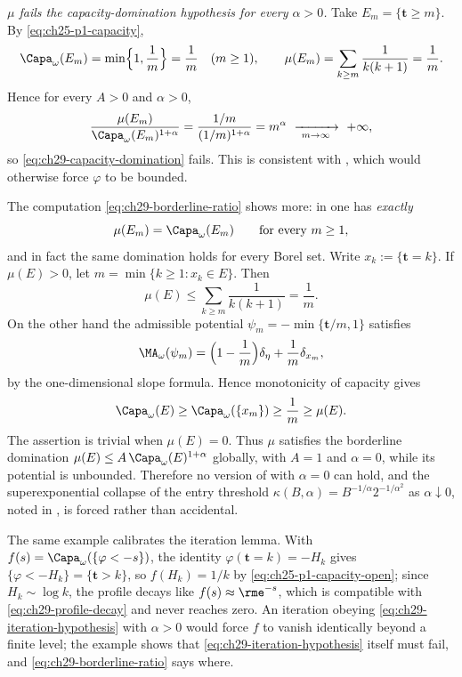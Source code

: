 \begin{example}
\emph{\(\mu\) fails the capacity-domination hypothesis for every
\(\alpha>0\).}  Take \(E_m=\{\mathbf t\geq m\}\).  By
\eqref{eq:ch25-p1-capacity},
\[
 \Capa_\omega(E_m)=\min\Bigl\{1,\frac1m\Bigr\}=\frac1m
 \quad(m\geq1),
 \qquad
 \mu(E_m)=\sum_{k\geq m}\frac1{k(k+1)}=\frac1m .
\]
Hence for every \(A>0\) and \(\alpha>0\),
\begin{equation}
\label{eq:ch29-borderline-ratio}
 \frac{\mu(E_m)}{\Capa_\omega(E_m)^{1+\alpha}}
 =\frac{1/m}{(1/m)^{1+\alpha}}=m^{\alpha}
 \ \xrightarrow[\ m\to\infty\ ]{}\ +\infty ,
\end{equation}
so \eqref{eq:ch29-capacity-domination} fails.  This is consistent with
, which would otherwise force \(\varphi\) to
be bounded.
\end{example}

\begin{example}[The exponent \(\alpha=0\) is not allowed]
\label{ex:ch29-borderline}
The computation \eqref{eq:ch29-borderline-ratio} shows more: in
 one has \emph{exactly}
\[
 \mu(E_m)=\Capa_\omega(E_m)\qquad\text{for every }m\geq1 ,
\]
and in fact the same domination holds for every Borel set.  Write
\(x_k:=\{\mathbf t=k\}\).  If \(\mu(E)>0\), let
\(m=\min\{k\geq1:x_k\in E\}\).  Then
\[
 \mu(E)\leq\sum_{k\geq m}\frac1{k(k+1)}=\frac1m.
\]
On the other hand the admissible potential
\(\psi_m=-\min\{\mathbf t/m,1\}\) satisfies
\[
 \MA_\omega(\psi_m)
  =\Bigl(1-\frac1m\Bigr)\delta_\eta+\frac1m\delta_{x_m},
\]
by the one-dimensional slope formula.  Hence monotonicity of capacity gives
\[
 \Capa_\omega(E)\geq\Capa_\omega(\{x_m\})\geq\frac1m\geq\mu(E).
\]
The assertion is trivial when \(\mu(E)=0\).  Thus \(\mu\) satisfies the
borderline domination
\(\mu(E)\leq A\,\Capa_\omega(E)^{1+\alpha}\) globally, with \(A=1\) and
\(\alpha=0\), while its potential is unbounded.
Therefore no version of  with
\(\alpha=0\) can hold, and the superexponential collapse of the entry
threshold \(\kappa(B,\alpha)=B^{-1/\alpha}2^{-1/\alpha^2}\) as
\(\alpha\downarrow0\), noted in
, is forced rather than accidental.

The same example calibrates the iteration lemma.  With
\(f(s)=\Capa_\omega(\{\varphi<-s\})\), the identity
\(\varphi(\mathbf t=k)=-H_k\) gives
\(\{\varphi<-H_k\}=\{\mathbf t>k\}\), so
\(f(H_k)=1/k\) by \eqref{eq:ch25-p1-capacity-open}; since
\(H_k\sim\log k\), the profile decays like
\(f(s)\approx\rme^{-s}\), which is compatible with
\eqref{eq:ch29-profile-decay} and never reaches zero.  An iteration obeying
\eqref{eq:ch29-iteration-hypothesis} with \(\alpha>0\) would force
\(f\) to vanish identically beyond a finite level; the example shows that
\eqref{eq:ch29-iteration-hypothesis} itself must fail, and
\eqref{eq:ch29-borderline-ratio} says where.
\end{example}

